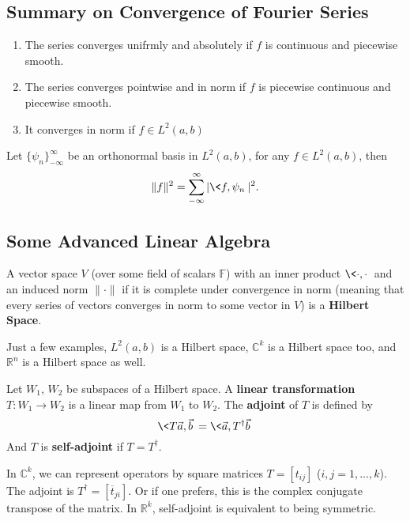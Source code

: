 \subsection{Summary on Convergence of Fourier Series}

\begin{enumerate}
\item The series converges unifrmly and absolutely if $f$ is
  continuous and piecewise smooth.
\item The series converges pointwise and in norm if $f$ is
  piecewise continuous and piecewise smooth.
\item It converges in norm if $f\in L^{2}(a,b)$
\end{enumerate}

\begin{parseval}
Let $\{\psi_n\}^{\infty}_{-\infty}$ be an orthonormal basis
in $L^{2}(a,b)$, for any $f\in L^{2}(a,b)$, then
\begin{equation}
\|f\|^2 = \sum^{\infty}_{-\infty}|\<f,\psi_n\>|^2.
\end{equation}
\end{parseval}

\subsection{Some Advanced Linear Algebra}

\begin{defn}
A vector space $V$ (over some field of scalars $\mathbb{F}$)
with an inner product $\<\cdot,\cdot\>$ and an induced norm
$\|\cdot\|$ if it is complete under convergence in norm
(meaning that every series of vectors converges in norm to
some vector in $V$) is a \textbf{Hilbert Space}.
\end{defn}
\begin{ex}
Just a few examples, $L^{2}(a,b)$ is a Hilbert space,
$\mathbb{C}^k$ is a Hilbert space too, and $\mathbb{R}^n$ is
a Hilbert space as well.
\end{ex}

\begin{defn}
Let $W_1$, $W_2$ be subspaces of a Hilbert space. A
\textbf{linear transformation} $T:W_1\to W_2$ is a linear
map from $W_1$ to $W_2$. The \textbf{adjoint} of $T$ is
defined by
\begin{equation}
\<T\vec{a},\vec{b}\>=\<\vec{a},T^{\dag}\vec{b}\>
\end{equation}
And $T$ is \textbf{self-adjoint} if $T=T^{\dag}$.
\end{defn}
\begin{ex}
In $\mathbb{C}^k$, we can represent operators by square
matrices $T=[t_{ij}]$ ($i,j=1,...,k$). The adjoint is
$T^{\dag}=[\overline{t}_{ji}]$. Or if one prefers, this is the
complex conjugate transpose of the matrix. In
$\mathbb{R}^k$, self-adjoint is equivalent to being
symmetric.
\end{ex}

